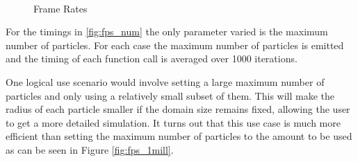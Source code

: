 \begin{figure}[!htc]
 		\centering
        \\
        \caption{Frame Rates}
        \label{fig:fps}
\end{figure}

\pagebreak

For the timings in \ref{fig:fps_num} the only parameter varied is the maximum number of particles.
For each case the maximum number of particles is emitted and the timing of each
function call is averaged over 1000 iterations.

One logical use scenario would involve setting a large maximum number of
particles and only using a relatively small subset of them. This will make the
radius of each particle smaller if the domain size remains fixed, allowing the
user to get a more detailed simulation. It turns out that this use case is much
more efficient than setting the maximum number of particles to the amount to be
used as can be seen in Figure \ref{fig:fps_1mill}.

